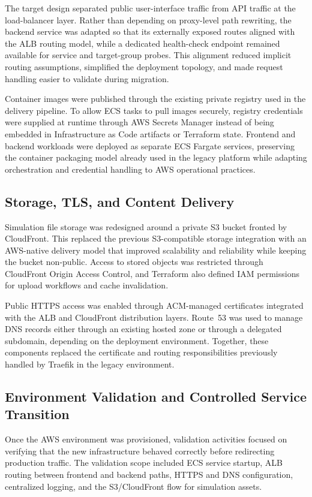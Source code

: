 The target design separated public user-interface traffic from API traffic at the load-balancer layer. Rather than depending on proxy-level path rewriting, the backend service was adapted so that its externally exposed routes aligned with the ALB routing model, while a dedicated health-check endpoint remained available for service and target-group probes. This alignment reduced implicit routing assumptions, simplified the deployment topology, and made request handling easier to validate during migration.

Container images were published through the existing private registry used in the delivery pipeline. To allow ECS tasks to pull images securely, registry credentials were supplied at runtime through AWS Secrets Manager instead of being embedded in Infrastructure as Code artifacts or Terraform state. Frontend and backend workloads were deployed as separate ECS Fargate services, preserving the container packaging model already used in the legacy platform while adapting orchestration and credential handling to AWS operational practices.

\subsection{Storage, TLS, and Content Delivery}
Simulation file storage was redesigned around a private S3 bucket fronted by CloudFront. This replaced the previous S3-compatible storage integration with an AWS-native delivery model that improved scalability and reliability while keeping the bucket non-public. Access to stored objects was restricted through CloudFront Origin Access Control, and Terraform also defined IAM permissions for upload workflows and cache invalidation.

Public HTTPS access was enabled through ACM-managed certificates integrated with the ALB and CloudFront distribution layers. Route~53 was used to manage DNS records either through an existing hosted zone or through a delegated subdomain, depending on the deployment environment. Together, these components replaced the certificate and routing responsibilities previously handled by Traefik in the legacy environment.

\subsection{Environment Validation and Controlled Service Transition}
Once the AWS environment was provisioned, validation activities focused on verifying that the new infrastructure behaved correctly before redirecting production traffic. The validation scope included ECS service startup, ALB routing between frontend and backend paths, HTTPS and DNS configuration, centralized logging, and the S3/CloudFront flow for simulation assets.

